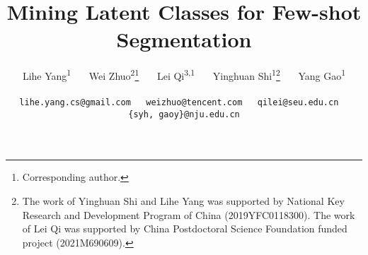 \documentclass[10pt,twocolumn,letterpaper]{article}
\newcommand*\samethanks[1][\value{footnote}]{\footnotemark[#1]}
\begin{document}
\title{Mining Latent Classes for Few-shot Segmentation\vspace{-0.5cm}}

\author{Lihe Yang\textsuperscript{\rm 1}~~~ Wei Zhuo\textsuperscript{\rm 2}\thanks{Corresponding author.}~~~ Lei Qi\textsuperscript{\rm 3,1}~~~ Yinghuan Shi\textsuperscript{\rm 1}\samethanks[1]\hspace{0.15cm}\thanks{The work of Yinghuan Shi and Lihe Yang was supported by National Key Research and Development Program of China (2019YFC0118300). The work of Lei Qi was supported by China Postdoctoral Science Foundation funded project (2021M690609).}~~~ Yang Gao\textsuperscript{\rm 1}\\
\vspace{-0.3cm}

\fontsize{11pt}{\baselineskip}
\vspace{0.1cm}

\small \texttt{lihe.yang.cs@gmail.com~~ weizhuo@tencent.com~~ qilei@seu.edu.cn~~ \{syh, gaoy\}@nju.edu.cn}}

\maketitle
\ificcvfinal\thispagestyle{empty}\fi

\thispagestyle{fancy}
\lhead{}
\chead{}
\rhead{}
\lfoot{}
\rfoot{}
\cfoot{\thepage}
\renewcommand{\headrulewidth}{0pt}
\renewcommand{\footrulewidth}{0pt}
\pagestyle{fancy}
\cfoot{\thepage}
\end{document}
